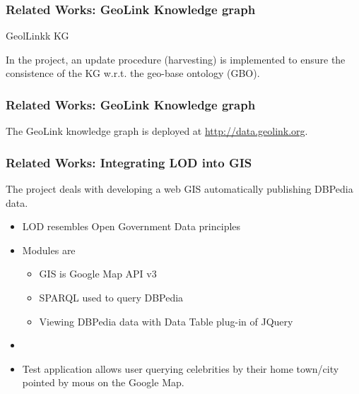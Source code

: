 \documentclass[10pt]{beamer}
\begin{document}
\begin{frame}
  \frametitle{Related Works: GeoLink Knowledge graph}
  GeolLinkk KG \cite{geolink}
  In the project, an update procedure (harvesting) is implemented to ensure the consistence of the KG w.r.t. the geo-base ontology (GBO).
\end{frame}

\begin{frame}
  \frametitle{Related Works: GeoLink Knowledge graph}
  The GeoLink knowledge graph is deployed at \url{http://data.geolink.org}.
\end{frame}



\begin{frame}
  \frametitle{Related Works: Integrating LOD into GIS}
  The project \cite{abid} deals with developing a web GIS automatically publishing DBPedia data.
  \begin{itemize}
  \item LOD resembles Open Government Data principles
  \item Modules are
    \begin{itemize}
    \item GIS is Google Map API v3
    \item SPARQL used to query DBPedia
    \item Viewing DBPedia data with Data Table plug-in of JQuery
    \end{itemize}
  \item
  \item Test application allows user querying celebrities by their home town/city pointed by mous on the Google Map.
  \end{itemize}
\end{frame}
\end{document}
